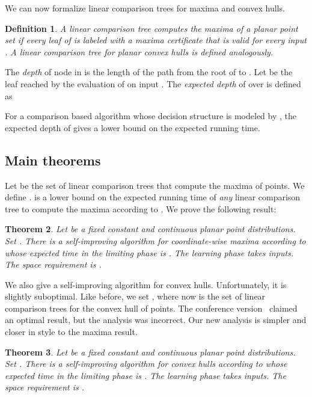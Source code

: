 \documentclass[letterpaper,11pt]{article}
\newtheorem{theorem}{Theorem}[section]
\newtheorem{definition}[theorem]{Definition}
\begin{document}
We can now formalize linear
comparison trees for maxima and
convex hulls.

\begin{definition}
  A  linear comparison tree  
  \emph{computes the maxima
  of a planar point set} if
  every leaf  of  is labeled
  with a maxima certificate that is 
  valid for every input .
  A linear comparison tree for planar
  convex hulls is defined analogously.
\end{definition}

The \emph{depth}  of node  in  
is the length of the path from the root 
of  to .  Let   be the 
leaf reached by the evaluation of 
 on input .  The 
\emph{expected depth} of  over 
 is defined as 

For a comparison based algorithm whose
decision structure is modeled by , 
the expected depth of  gives a lower
bound on the expected running time.


\subsection{Main theorems}

Let  be the set of linear comparison
trees that compute the maxima of  points.
We define .
 is a lower bound on the 
expected running time of \emph{any} linear
comparison tree to compute the maxima 
according to . We prove the following
result:


\begin{theorem}\label{thm:main-max} 
  Let  be a fixed constant and 
   continuous planar point 
  distributions. Set .
  There is a self-improving algorithm for 
  coordinate-wise maxima according to 
  whose expected time in the limiting phase is 
  . 
  The learning phase takes  inputs. 
  The space requirement is .
\end{theorem}

We also give a self-improving algorithm 
for convex hulls. Unfortunately, it is 
slightly suboptimal. Like before, we set 
, 
where now  is the set of linear comparison 
trees for the convex hull of  points. 
The conference version~\cite{ClarksonMuSe10}
claimed an optimal result, but the analysis was incorrect. Our new analysis is simpler and 
closer in style to the maxima result.

\begin{theorem}\label{thm:main-ch} 
  Let  be a fixed constant 
  and  
  continuous planar point distributions. 
  Set . There is a 
  self-improving algorithm for convex hulls
  according to  whose expected time in 
  the limiting phase is 
  . 
  The learning phase takes  inputs. 
  The space requirement is .
\end{theorem}
\end{document}
